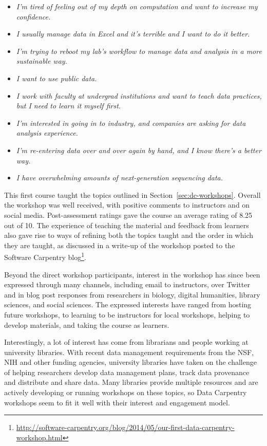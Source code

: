 \documentclass[11pt]{article}
\begin{document}
\begin{itemize}
\item \emph{I'm tired of feeling out of my depth on computation and want to increase my confidence.}
\item \emph{I usually manage data in Excel and it's terrible and I want to do it better.}
\item \emph{I'm trying to reboot my lab's workflow to manage data and analysis in a more sustainable way.}
\item \emph{I want to use public data.}
\item \emph{I work with faculty at undergrad institutions and want to teach data practices, but I need to learn it myself first.}
\item \emph{I'm interested in going in to industry, and companies are asking for data analysis experience.}
\item \emph{I'm re-entering data over and over again by hand, and I know there's a better way.}
\item \emph{I have overwhelming amounts of next-generation sequencing data.}
\end{itemize}

This first course taught the topics outlined in Section~\ref{sec:dc-workshops}. Overall the workshop was well received, with positive comments to instructors and on social media. Post-assessment ratings gave the course an average rating of 8.25 out of 10. The experience of teaching the material and feedback from learners also gave rise to ways of refining both the topics taught and the order in which they are taught, as discussed in a write-up of the workshop posted to the Software Carpentry blog\footnote{\url{http://software-carpentry.org/blog/2014/05/our-first-data-carpentry-workshop.html}}.

Beyond the direct workshop participants, interest in the workshop has since been expressed through many channels, including email to instructors, over Twitter and in blog post responses from researchers in biology, digital humanities, library sciences, and social sciences.
The expressed interests have  
ranged from hosting future workshops, to learning to be 
instructors for local workshops, helping to develop materials, and taking the course as learners.

Interestingly, a lot of interest has come from librarians and people working at university libraries. With recent data management requirements from the NSF, NIH and other funding agencies, university libraries have
taken on the challenge of helping researchers develop data management plans, track data provenance and 
distribute and share data. Many libraries provide multiple resources and are actively developing or running workshops
on these topics, so Data Carpentry workshops seem to fit it well with their interest and engagement model.
\end{document}
